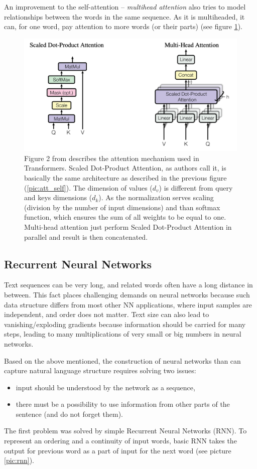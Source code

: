 An improvement to the self-attention -- \textit{multihead attention} \citep{Vaswani2017} also tries to model relationships between the words in the same sequence. As it is multiheaded, it can, for one word, pay attention to more words (or their parts) (see figure \ref{pic:att_multi}).
\begin{figure}[H]
\centering
\includegraphics[width=1\columnwidth]{../img/attention_multi1}
\caption{Figure 2 from \citep{Vaswani2017} describes the attention mechanism used in Transformers. Scaled Dot-Product Attention, as authors call it, is basically the same architecture as described in the previous figure (\ref{pic:att_self}). The dimension of values ($d_v$) is different from query and keys dimensions ($d_k$). As the normalization serves scaling (division by the number of input dimensions) and than softmax function, which ensures the sum of all weights to be equal to one. Multi-head attention just perform Scaled Dot-Product Attention in parallel and result is then concatenated.
}
\label{pic:att_multi}
\end{figure}
\subsection{Recurrent Neural Networks}
\label{sub:RNN}
Text sequences can be very long, and related words often have a long distance in between. This fact places challenging demands on neural networks because such data structure differs from most other NN applications, where input samples are independent, and order does not matter. Text size can also lead to vanishing/exploding gradients because information should be carried for many steps, leading to many multiplications of very small or big numbers in neural networks. %
\par
Based on the above mentioned, the construction of neural networks than can capture natural language structure requires solving two issues:
\begin{itemize}
\item input should be understood by the network as a sequence,
\item there must be a possibility to use information from other parts of the sentence (and do not forget them).
\end{itemize}
The first problem was solved by simple Recurrent Neural Networks (RNN). To represent an ordering and a continuity of input words, basic RNN takes the output for previous word as a part of input for the next word (see picture \ref{pic:rnn}). 
 
